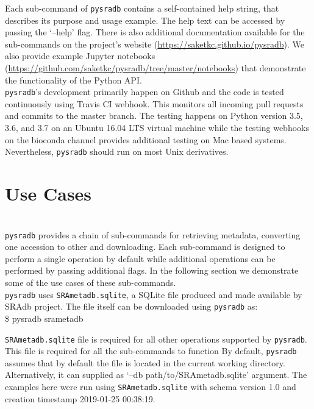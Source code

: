 \documentclass[9pt,a4paper]{extarticle}
\newenvironment{allintypewriter}{\ttfamily}{\par}
\begin{document}
Each sub-command of \texttt{pysradb} contains a self-contained help string,
that describes its purpose and usage example. The help text can be accessed
by passing the `--help' flag. There is also additional documentation available
for the sub-commands on the project's website (\url{https://saketkc.github.io/pysradb}).
We also provide example Jupyter \cite{Kluyver:2016aa} notebooks (\url{https://github.com/saketkc/pysradb/tree/master/notebooks})
that demonstrate the functionality of the Python API. 
~\\

\texttt{pysradb}'s development primarily happen on Github
and the code is tested continuously using Travis CI webhook. This monitors
all incoming pull requests and commits to the master branch. The testing
happens on Python version 3.5, 3.6, and 3.7 on an Ubuntu 16.04 LTS virtual
machine while the testing webhooks on the bioconda channel provides
additional testing on Mac based systems. Nevertheless, \texttt{pysradb} should
run on most Unix derivatives.
~\\
\section*{Use Cases} %
~\\
\texttt{pysradb} provides a chain of sub-commands for retrieving metadata, converting
one accession to other and downloading. Each sub-command is designed to perform
a single operation by default while additional operations can be performed by passing 
additional flags. In the following section we demonstrate some of the use cases
of these sub-commands.
~\\

\texttt{pysradb} uses \texttt{SRAmetadb.sqlite}, a SQLite file produced and made available by SRAdb 
\cite{zhu2013sradb} project. The file itself can be downloaded using
\texttt{pysradb} as:\\

\begin{allintypewriter}
\$ pysradb srametadb\\
\end{allintypewriter}
\texttt{SRAmetadb.sqlite} file is required for all other operations supported
by \texttt{pysradb}. This file is required for all the sub-commands to function
By default, \texttt{pysradb} assumes that by default the file is located in the current
working directory. Alternatively, it can supplied as `--db path/to/SRAmetadb.sqlite' argument.
The examples here were run using \texttt{SRAmetadb.sqlite} with schema version 1.0 and 
creation timestamp	2019-01-25 00:38:19.
~\\
\end{document}
